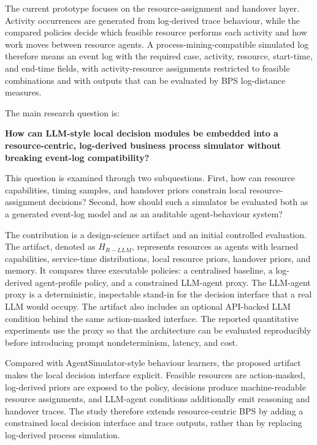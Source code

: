 The current prototype focuses on the resource-assignment and handover
layer. Activity occurrences are generated from log-derived trace
behaviour, while the compared policies decide which feasible resource
performs each activity and how work moves between resource agents. A
process-mining-compatible simulated log therefore means an event log
with the required case, activity, resource, start-time, and end-time
fields, with activity-resource assignments restricted to feasible
combinations and with outputs that can be evaluated by BPS log-distance
measures.

The main research question is:

\textbf{How can LLM-style local decision modules be embedded into a
resource-centric, log-derived business process simulator without
breaking event-log compatibility?}

This question is examined through two subquestions. First, how can
resource capabilities, timing samples, and handover priors constrain
local resource-assignment decisions? Second, how should such a simulator
be evaluated both as a generated event-log model and as an auditable
agent-behaviour system?

The contribution is a design-science artifact and an initial controlled
evaluation. The artifact, denoted as \(H_{R-LLM}\),
represents resources as agents with learned capabilities, service-time
distributions, local resource priors, handover priors, and memory. It
compares three executable policies: a centralised baseline, a
log-derived agent-profile policy, and a constrained LLM-agent proxy. The
LLM-agent proxy is a deterministic, inspectable stand-in for the
decision interface that a real LLM would occupy. The artifact also
includes an optional API-backed LLM condition behind the same
action-masked interface. The reported quantitative experiments use the
proxy so that the architecture can be evaluated reproducibly before
introducing prompt nondeterminism, latency, and cost.

Compared with AgentSimulator-style behaviour learners, the proposed
artifact makes the local decision interface explicit. Feasible resources
are action-masked, log-derived priors are exposed to the policy,
decisions produce machine-readable resource assignments, and LLM-agent
conditions additionally emit reasoning and handover traces. The study
therefore extends resource-centric BPS by adding a constrained local
decision interface and trace outputs, rather than by replacing
log-derived process simulation.


